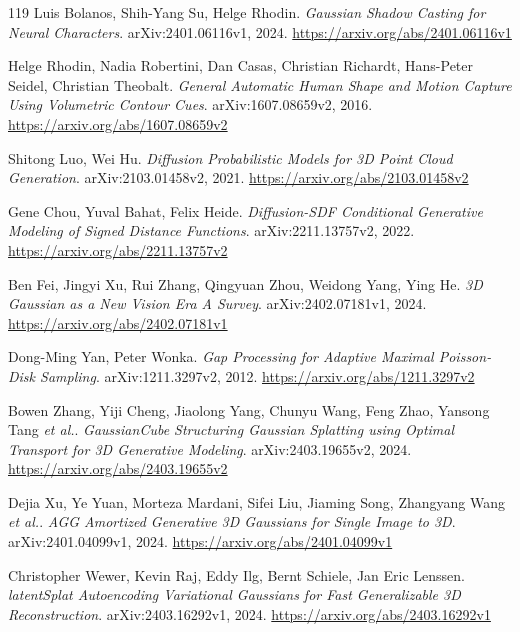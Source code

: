 \documentclass[11pt,a4paper]{article}
\begin{document}
\begin{thebibliography}{119}
Luis Bolanos, Shih-Yang Su, Helge Rhodin.
\newblock \emph{Gaussian Shadow Casting for Neural Characters}.
\newblock arXiv:2401.06116v1, 2024.
\newblock \url{https://arxiv.org/abs/2401.06116v1}

Helge Rhodin, Nadia Robertini, Dan Casas, Christian Richardt, Hans-Peter Seidel, Christian Theobalt.
\newblock \emph{General Automatic Human Shape and Motion Capture Using Volumetric Contour Cues}.
\newblock arXiv:1607.08659v2, 2016.
\newblock \url{https://arxiv.org/abs/1607.08659v2}

Shitong Luo, Wei Hu.
\newblock \emph{Diffusion Probabilistic Models for 3D Point Cloud Generation}.
\newblock arXiv:2103.01458v2, 2021.
\newblock \url{https://arxiv.org/abs/2103.01458v2}

Gene Chou, Yuval Bahat, Felix Heide.
\newblock \emph{Diffusion-SDF Conditional Generative Modeling of Signed Distance Functions}.
\newblock arXiv:2211.13757v2, 2022.
\newblock \url{https://arxiv.org/abs/2211.13757v2}

Ben Fei, Jingyi Xu, Rui Zhang, Qingyuan Zhou, Weidong Yang, Ying He.
\newblock \emph{3D Gaussian as a New Vision Era A Survey}.
\newblock arXiv:2402.07181v1, 2024.
\newblock \url{https://arxiv.org/abs/2402.07181v1}

Dong-Ming Yan, Peter Wonka.
\newblock \emph{Gap Processing for Adaptive Maximal Poisson-Disk Sampling}.
\newblock arXiv:1211.3297v2, 2012.
\newblock \url{https://arxiv.org/abs/1211.3297v2}

Bowen Zhang, Yiji Cheng, Jiaolong Yang, Chunyu Wang, Feng Zhao, Yansong Tang \emph{et al.}.
\newblock \emph{GaussianCube Structuring Gaussian Splatting using Optimal Transport for 3D Generative Modeling}.
\newblock arXiv:2403.19655v2, 2024.
\newblock \url{https://arxiv.org/abs/2403.19655v2}

Dejia Xu, Ye Yuan, Morteza Mardani, Sifei Liu, Jiaming Song, Zhangyang Wang \emph{et al.}.
\newblock \emph{AGG Amortized Generative 3D Gaussians for Single Image to 3D}.
\newblock arXiv:2401.04099v1, 2024.
\newblock \url{https://arxiv.org/abs/2401.04099v1}

Christopher Wewer, Kevin Raj, Eddy Ilg, Bernt Schiele, Jan Eric Lenssen.
\newblock \emph{latentSplat Autoencoding Variational Gaussians for Fast Generalizable 3D Reconstruction}.
\newblock arXiv:2403.16292v1, 2024.
\newblock \url{https://arxiv.org/abs/2403.16292v1}


\end{thebibliography}
\end{document}
